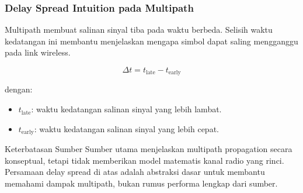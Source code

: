 \subsubsection{Delay Spread Intuition pada Multipath}
\begin{jawab}
Multipath membuat salinan sinyal tiba pada waktu berbeda. Selisih waktu kedatangan ini membantu menjelaskan mengapa simbol dapat saling mengganggu pada link wireless.
\end{jawab}

\begin{equation}
    \Delta t = t_{\text{late}} - t_{\text{early}}
    \label{eq:multipath-delay-spread}
\end{equation}

dengan:
\begin{itemize}
    \item $t_{\text{late}}$: waktu kedatangan salinan sinyal yang lebih lambat.
    \item $t_{\text{early}}$: waktu kedatangan salinan sinyal yang lebih cepat.
\end{itemize}

\begin{cmt}{Keterbatasan Sumber}{}
Sumber utama menjelaskan multipath propagation secara konseptual, tetapi tidak memberikan model matematis kanal radio yang rinci. Persamaan delay spread di atas adalah abstraksi dasar untuk membantu memahami dampak multipath, bukan rumus performa lengkap dari sumber.
\end{cmt}
